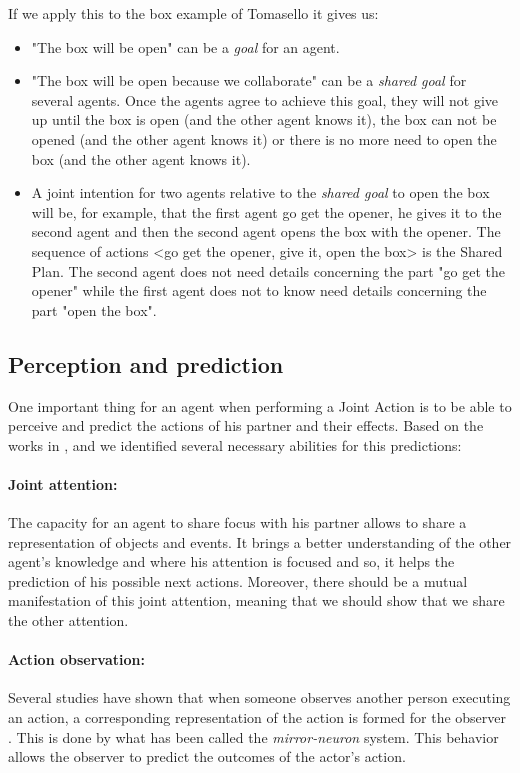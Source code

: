 \documentclass[english,a4paper,11pt,twoside]{StyleThese}
\begin{document}
If we apply this to the box example of Tomasello it gives us:
\begin{itemize}
\item "The box will be open" can be a \textit{goal} for an agent.
\item "The box will be open because we collaborate" can be a \textit{shared goal} for several agents. Once the agents agree to achieve this goal, they will not give up until the box is open (and the other agent knows it), the box can not be opened (and the other agent knows it) or there is no more need to open the box (and the other agent knows it).
\item A joint intention for two agents relative to the \textit{shared goal} to open the box will be, for example, that the first agent go get the opener, he gives it to the second agent and then the second agent opens the box with the opener. The sequence of actions <go get the opener, give it, open the box> is the Shared Plan. The second agent does not need details concerning the part "go get the opener" while the first agent does not to know need details concerning the part "open the box".
\end{itemize}

\subsection{Perception and prediction}

\label{subsec:prediction}

One important thing for an agent when performing a Joint Action is to be able to perceive and predict the actions of his partner and their effects. Based on the works in \cite{sebanz2006joint}, \cite{pacherie2011phenomenology} and \cite{obhi2011moving} we identified several necessary abilities for this predictions:

\paragraph{Joint attention:} The capacity for an agent to share focus with his partner allows to share a representation of objects and events. It brings a better understanding of the other agent's knowledge and where his attention is focused and so, it helps the prediction of his possible next actions. Moreover, there should be a mutual manifestation of this joint attention, meaning that we should show that we share the other attention. 

\paragraph{Action observation:} Several studies have shown that when someone observes another person executing an action, a corresponding representation of the action is formed for the observer \cite{rizzolatti2004mirror}. This is done by what has been called the \textit{mirror-neuron} system. This behavior allows the observer to predict the outcomes of the actor's action. 
\end{document}
